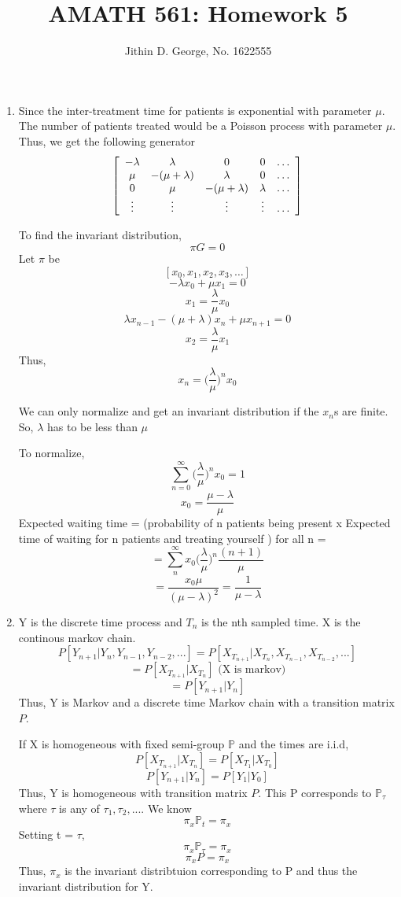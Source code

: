\documentclass[a4paper,11pt]{article}
\title{AMATH 561: Homework 5}
\author{Jithin D. George, No. 1622555}
\newenvironment{mat}{\left[ \begin{array}{ccccccccccccc}}{\end{array}\right]}
\newcommand\bcm{\begin{mat}}
\newcommand\ecm{\end{mat}}
\begin{document}
\maketitle
\begin{enumerate}

\item  Since the inter-treatment time for patients is exponential with parameter $\mu$. The number of patients treated would be a Poisson process with parameter $\mu$. Thus, we get the following generator
\[\bcm -\lambda &\lambda &0 &0 &\hdots \\ \mu &-(\mu+\lambda) &\lambda  &0 &\hdots \\0 &\mu &-(\mu+\lambda) &\lambda   &\hdots\\ \vdots &\vdots&\vdots  &\vdots &\hdots \ecm\]

To find the invariant distribution,
\[\pi G =0\]
Let $\pi$ be
\[ [x_0, x_1, x_2,x_3 ,\ldots]\]
\[-\lambda x_0 + \mu x_1 =0\]
\[x_1 = \frac{\lambda}{\mu}x_0\]
\[\lambda x_{n-1} -(\mu +\lambda)x_n + \mu x_{n+1} =0\]
\[x_2 = \frac{\lambda}{\mu} x_1\]
Thus, \[x_n =\bigg(\frac{\lambda}{\mu}\bigg)^n x_0 \]

We can only normalize and get an invariant distribution if the $x_n$s are finite. So, $\lambda$ has to be less than $\mu$

To normalize,
\[\sum_{n=0}^{\infty} \bigg(\frac{\lambda}{\mu}\bigg)^n x_0= 1 \]
\[ x_0= \frac{\mu-\lambda}{\mu}\]
Expected waiting time = (probability of n patients being present x Expected time of waiting for n patients and treating yourself ) for all n = 
\[ = \sum_n^\infty x_0 \bigg(\frac{\lambda}{\mu}\bigg)^n \frac{(n+1)}{\mu} \]
\[ = \frac{x_0\mu}{(\mu-\lambda)^2}  = \frac{1}{\mu-\lambda}\]
\item
Y is the discrete time process and $T_n$ is the nth sampled time. X is the continous markov chain.
\[P[Y_{n+1}|Y_{n}, Y_{n-1}, Y_{n-2} ,...] = P[X_{T_{n+1}}|X_{T_{n}}, X_{T_{n-1}}, X_{T_{n-2}} ,...] \]
\[ = P[X_{T_{n+1}}|X_{T_{n}}] \text{ (X is markov)}  \]
\[ = P[Y_{n+1}|Y_{n}]  \]
Thus, Y is Markov and a discrete time Markov chain with a transition matrix $P$.





If X is homogeneous with fixed semi-group $\mathbb{P}$ and the times are i.i.d,
\[ P[X_{T_{n+1}}|X_{T_{n}}] = P[X_{T_{1}}|X_{T_{0}}]\] 
\[ P[Y_{n+1}|Y_{n}] = P[Y_{1}|Y_{0}]\] 
Thus, Y is homogeneous with transition matrix $P$. This P corresponds to $\mathbb{P}_{\tau}$ where $\tau$ is any of $\tau_1,\tau_2,...$.
We know
\[\pi_x\mathbb{P}_{t} = \pi_x\]
Setting t = $\tau$,
\[\pi_x\mathbb{P}_{\tau} = \pi_x\]
\[\pi_x P = \pi_x\]
Thus, $\pi_x$ is the invariant distribtuion corresponding to P and thus the invariant distribution for Y.



\end{enumerate}
\end{document}
